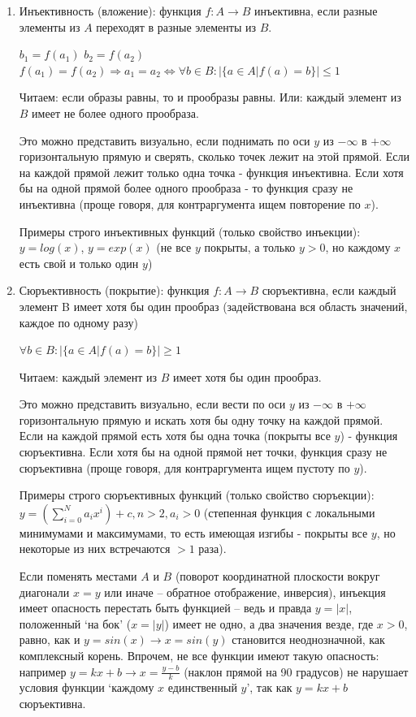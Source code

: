 \documentclass{book}
\begin{document}
\begin{enumerate}[label=\arabic*., parsep=4pt, itemsep=4pt, topsep=4pt, partopsep=0pt]

\item Инъективность (вложение): функция $f: A \to B$ инъективна, если разные элементы из $A$ переходят в разные элементы из $B$.

$b_1 = f(a_1)$
$b_2 = f(a_2)$
$f(a_1) = f(a_2) \Rightarrow a_1 = a_2 \Leftrightarrow \forall b \in B: |\{a \in A | f(a)=b\}| \le 1$

Читаем: если образы равны, то и прообразы равны. Или: каждый элемент из $B$ имеет не более одного прообраза.

Это можно представить визуально, если поднимать по оси $y$ из $-\infty$ в $+\infty$ горизонтальную прямую и сверять, сколько точек лежит на этой прямой. Если на каждой прямой лежит только одна точка - функция инъективна. Если хотя бы на одной прямой более одного прообраза - то функция сразу не инъективна (проще говоря, для контраргумента ищем повторение по $x$).

Примеры строго инъективных функций (только свойство инъекции): $y = log(x)$, $y = exp(x)$ (не все $y$ покрыты, а только $y>0$, но каждому $x$ есть свой и только один $y$)

\item Сюръективность (покрытие): функция $f: A \to B$ сюръективна, если каждый элемент B имеет хотя бы один прообраз (задействована вся область значений, каждое по одному разу)

$\forall b \in B: |\{a \in A| f(a)=b\}| \ge 1$

Читаем: каждый элемент из $B$ имеет хотя бы один прообраз.

Это можно представить визуально, если вести по оси $y$ из $-\infty$ в $+\infty$ горизонтальную прямую и искать хотя бы одну точку на каждой прямой. Если на каждой прямой есть хотя бы одна точка (покрыты все $y$) - функция сюръективна. Если хотя бы на одной прямой нет точки, функция сразу не сюръективна (проще говоря, для контраргумента ищем пустоту по $y$).

Примеры строго сюръективных функций (только свойство сюръекции): $y = (\sum_{i=0}^{N}a_ix^i)+c, n > 2, a_i > 0$ (степенная функция с локальными минимумами и максимумами, то есть имеющая изгибы - покрыты все $y$, но некоторые из них встречаются $>1$ раза).

Если поменять местами $A$ и $B$ (поворот координатной плоскости вокруг диагонали $x=y$ или иначе -- обратное отображение, инверсия), инъекция имеет опасность перестать быть функцией -- ведь и правда $y = |x|$, положенный `на бок' ($x = |y|$) имеет не одно, а два значения везде, где $x>0$, равно, как и $y = sin(x) \longrightarrow x = sin(y)$ становится неоднозначной, как комплексный корень. Впрочем, не все функции имеют такую опасность: например $y=kx+b \longrightarrow x = \frac{y-b}{k}$ (наклон прямой на 90 градусов) не нарушает условия функции `каждому $x$ единственный $y$', так как $y=kx+b$ сюръективна.


\end{enumerate}
\end{document}
